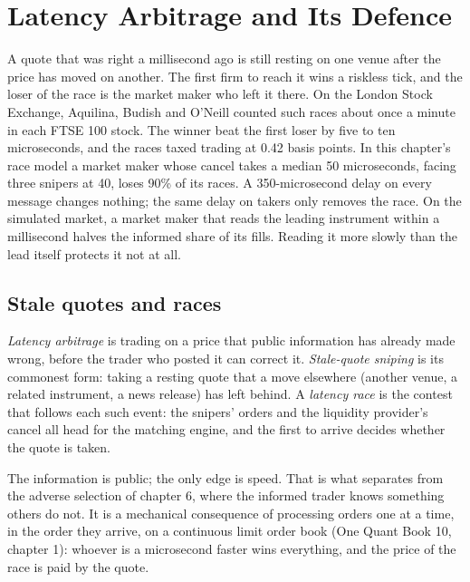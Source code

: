 \chapter{Latency Arbitrage and Its Defence}\label{ch:hf:latency-arbitrage-and-its-defence}

A quote that was right a millisecond ago is still resting on one venue after the price has moved on another. The first firm to reach it wins a
riskless tick, and the loser of the race is the market maker who left it there. On the London Stock Exchange, Aquilina, Budish and O'Neill counted
such races about once a minute in each FTSE 100 stock. The winner beat the first loser by five to ten microseconds, and the races taxed trading at
0.42 basis points. In this chapter's race model a market maker whose cancel takes a median 50 microseconds, facing three snipers at 40, loses 90\% of
its races. A 350-microsecond delay on every message changes nothing; the same delay on takers only removes the race. On the simulated market, a
market maker that reads the leading instrument within a millisecond halves the informed share of its fills. Reading it more slowly than the lead
itself protects it not at all.

\section{Stale quotes and races}

\begin{definition}\label{def:hf:latency-arbitrage-and-its-defence:arb}
\emph{Latency arbitrage} is trading on a price that public information has already made wrong, before the trader who posted
it can correct it. \emph{Stale-quote sniping} is its commonest form: taking a resting quote that a move elsewhere (another
venue, a related instrument, a news release) has left behind. A \emph{latency race} is the contest that follows each such event:
the snipers' orders and the liquidity provider's cancel all head for the matching engine, and the first to arrive decides whether the quote is
taken.
\end{definition}

The information is public; the only edge is speed. That is what separates  from the adverse selection of chapter 6, where the
informed trader knows something others do not. It is a mechanical consequence of processing orders one at a time, in the order they arrive, on a
continuous limit order book (One Quant Book 10, chapter 1): whoever is a microsecond faster wins everything, and the price of the race is paid by
the quote.

